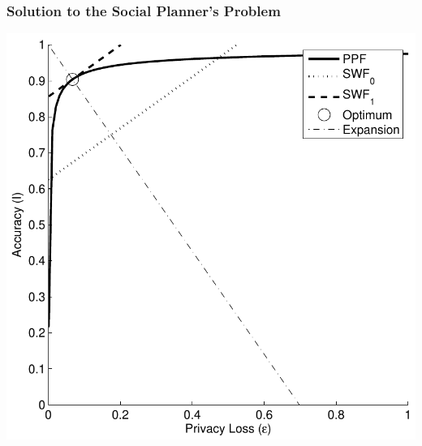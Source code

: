 \begin{frame}[allowframebreaks]%
\frametitle{Solution to the Social Planner's Problem}

\begin{center}
	\includegraphics[scale=.5]{plannersprob_income}
\end{center}


\end{frame}%
%




